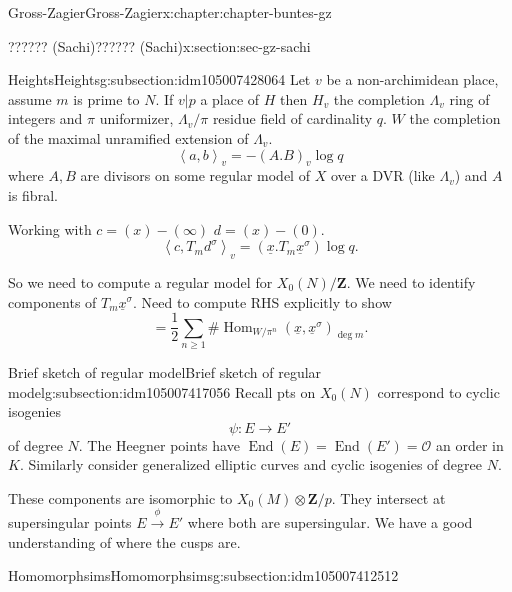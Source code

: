 \documentclass[oneside,10pt,]{book}
\numberwithin{equation}{section}
\newcommand{\pair}[2]{\left\langle #1, #2 \right\rangle}
\newcommand{\ZZ}{\mathbf{Z}}
\newcommand{\ints}{\mathcal{O}}
\DeclareMathOperator{\End}{End}
\DeclareMathOperator{\Hom}{Hom}
\begin{document}
\begin{chapterptx}{Gross-Zagier}{}{Gross-Zagier}{}{}{x:chapter:chapter-buntes-gz}
\begin{sectionptx}{?????? (Sachi)}{}{?????? (Sachi)}{}{}{x:section:sec-gz-sachi}
\begin{subsectionptx}{Heights}{}{Heights}{}{}{g:subsection:idm105007428064}
Let \(v\) be a non-archimidean place, assume \(m\) is prime to \(N\). If \(v|p\) a place of \(H\) then \(H_v\) the completion \(\Lambda _v\) ring of integers and \(\pi \) uniformizer, \(\Lambda _v/\pi \) residue  field of cardinality \(q\). \(W\) the completion of the maximal unramified extension of \(\Lambda _v\).%
\begin{equation*}
\pair ab_v = -(A.B) _v \log q
\end{equation*}
where \(A,B\) are divisors on some regular model of \(X\) over  a DVR (like \(\Lambda _v\)) and \(A\) is fibral.%
\par
Working with \(c = (x)-(\infty )\) \(d = (x)-(0)\).%
\begin{equation*}
\pair c{T_m d^\sigma }_v = (\underline x. T_m \underline x^\sigma )\log q\text{.}
\end{equation*}
%
\par
So we need to compute a regular model for \(X_0(N)/\ZZ\). We need to identify components of \(T_m \underline x^\sigma \). Need to compute RHS explicitly to show%
\begin{equation*}
= \frac 12 \sum_{n\ge 1} \#\Hom _{W/\pi ^n} (\underline x ,\underline x^\sigma )_{\deg m}\text{.}
\end{equation*}
%
\end{subsectionptx}
%
%
\typeout{************************************************}
\typeout{************************************************}
%
\begin{subsectionptx}{Brief sketch of regular model}{}{Brief sketch of regular model}{}{}{g:subsection:idm105007417056}
Recall pts on \(X_0(N)\) correspond to cyclic isogenies%
\begin{equation*}
\psi \colon E \to  E'
\end{equation*}
of degree \(N\). The Heegner points have \(\End(E) = \End(E') = \ints\) an order in \(K\). Similarly consider generalized elliptic curves and cyclic isogenies of degree \(N\).%
\par
These components are isomorphic to \(X_0(M) \otimes \ZZ/p\). They intersect at supersingular points \(E\xrightarrow \phi E'\) where both are supersingular. We have  a good understanding of where the cusps are.%
\end{subsectionptx}
%
%
\typeout{************************************************}
\typeout{************************************************}
%
\begin{subsectionptx}{Homomorphsims}{}{Homomorphsims}{}{}{g:subsection:idm105007412512}

\end{subsectionptx}
\end{sectionptx}
\end{chapterptx}
\end{document}
